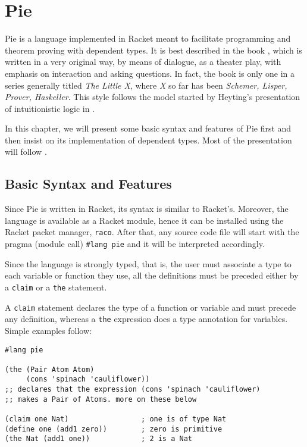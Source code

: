 \chapter{Pie}

\indent\indent Pie is a language implemented in Racket meant to facilitate programming
and theorem proving with dependent types. It is best described in the
book \cite{typer}, which is written in a very original way, by means of
dialogue, as a theater play, with emphasis on interaction and asking
questions. In fact, the book is only one in a series generally titled
\emph{The Little X}, where \emph{X} so far has been
\emph{Schemer, Lisper, Prover, Haskeller}. This style follows the model started
by Heyting's presentation of intuitionistic logic in \cite{heyting}.

In this chapter, we will present some basic syntax and features of Pie
first and then insist on its implementation of dependent types. Most
of the presentation will follow \cite{typer}.

\section{Basic Syntax and Features}

\indent\indent Since Pie is written in Racket, its syntax is similar to Racket's.
Moreover, the language is available as a Racket module, hence it can be
installed using the Racket packet manager, \texttt{raco}. After that,
any source code file will start with the pragma (module call)
\texttt{\#lang pie} and it will be interpreted accordingly.

Since the language is strongly typed, that is, the user must associate a
type to each variable or function they use, all the definitions must be
preceded either by a \texttt{claim} or a \texttt{the} statement.

A \texttt{claim} statement declares the type of a function or variable
and must precede any definition, whereas a \texttt{the} expression
does a type annotation for variables. Simple examples follow:
{
  \small
\begin{verbatim}
#lang pie

(the (Pair Atom Atom)
     (cons 'spinach 'cauliflower))
;; declares that the expression (cons 'spinach 'cauliflower)
;; makes a Pair of Atoms. more on these below

(claim one Nat)                 ; one is of type Nat
(define one (add1 zero))        ; zero is primitive
(the Nat (add1 one))            ; 2 is a Nat
\end{verbatim}
}

